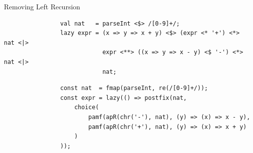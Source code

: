 \documentclass[aspectratio=169]{beamer}
\begin{document}
    \begin{frame}[fragile]{Removing Left Recursion}
        \begin{overprint}
            \begin{verbatim}
                val nat   = parseInt <$> /[0-9]+/;
                lazy expr = (x => y => x + y) <$> (expr <* '+') <*> nat <|>
                            expr <**> ((x => y => x - y) <$ '-') <*> nat <|>
                            nat;
            \end{verbatim}
            \begin{verbatim}
                const nat  = fmap(parseInt, re(/[0-9]+/));
                const expr = lazy(() => postfix(nat,
                    choice(
                        pamf(apR(chr('-'), nat), (y) => (x) => x - y),
                        pamf(apR(chr('+'), nat), (y) => (x) => x + y)
                    )
                ));
            \end{verbatim}
        \end{overprint}
    \end{frame}
\end{document}

